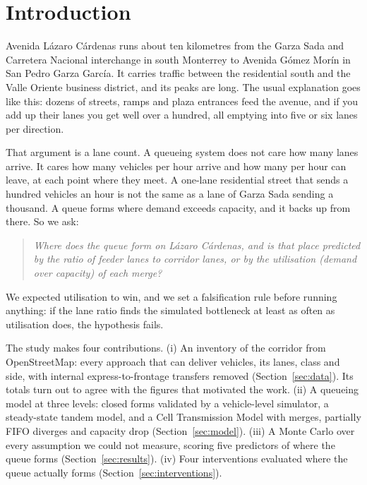 \section{Introduction}
\label{sec:intro}

Avenida L\'azaro C\'ardenas runs about ten kilometres from the Garza Sada
and Carretera Nacional interchange in south Monterrey to Avenida Gómez
Mor\'in in San Pedro Garza Garc\'ia. It carries traffic between the
residential south and the Valle Oriente business district, and its peaks
are long. The usual explanation goes like this: dozens of streets, ramps
and plaza entrances feed the avenue, and if you add up their lanes you get
well over a hundred, all emptying into five or six lanes per direction.

That argument is a lane count. A queueing system does not care how many
lanes arrive. It cares how many vehicles per hour arrive and how many per
hour can leave, at each point where they meet. A one-lane residential
street that sends a hundred vehicles an hour is not the same as a lane of
Garza Sada sending a thousand. A queue forms where demand exceeds capacity,
and it backs up from there. So we ask:

\begin{quote}
\emph{Where does the queue form on L\'azaro C\'ardenas, and is that place
predicted by the ratio of feeder lanes to corridor lanes, or by the
utilisation (demand over capacity) of each merge?}
\end{quote}

We expected utilisation to win, and we set a falsification rule before
running anything: if the lane ratio finds the simulated bottleneck at
least as often as utilisation does, the hypothesis fails.

The study makes four contributions. (i) An inventory of the corridor from
OpenStreetMap: every approach that can deliver vehicles, its lanes, class
and side, with internal express-to-frontage transfers removed
(Section~\ref{sec:data}). Its totals turn out to agree with the figures
that motivated the work. (ii) A queueing model at three levels: closed
forms validated by a vehicle-level simulator, a steady-state tandem
model, and a Cell Transmission Model with merges, partially FIFO
diverges and capacity drop (Section~\ref{sec:model}). (iii) A Monte
Carlo over every assumption we could not measure, scoring five
predictors of where the queue forms (Section~\ref{sec:results}).
(iv) Four interventions evaluated where the queue actually forms
(Section~\ref{sec:interventions}).
